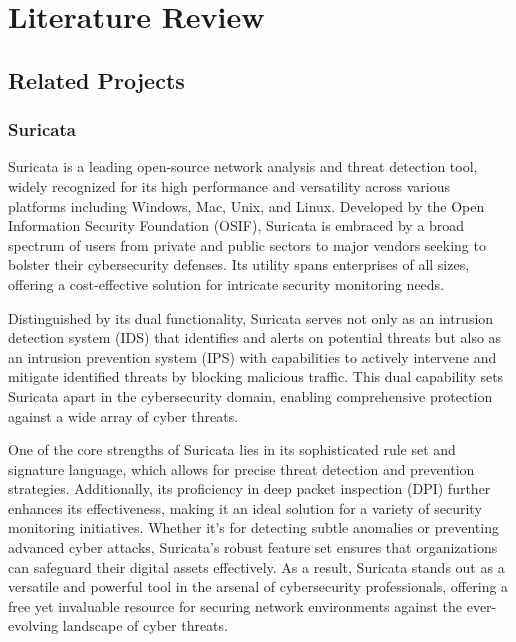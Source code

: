 \chapter{Literature Review}
\vspace{-18pt}
\section{Related Projects}
\vspace{-18pt}
\subsection{Suricata}
\vspace{-18pt}
Suricata is a leading open-source network analysis and threat detection tool, widely recognized for its high performance and versatility across various platforms including Windows, Mac, Unix, and Linux. Developed by the Open Information Security Foundation (OSIF), Suricata is embraced by a broad spectrum of users from private and public sectors to major vendors seeking to bolster their cybersecurity defenses. Its utility spans enterprises of all sizes, offering a cost-effective solution for intricate security monitoring needs.\par 
Distinguished by its dual functionality, Suricata serves not only as an intrusion detection system (IDS) that identifies and alerts on potential threats but also as an intrusion prevention system (IPS) with capabilities to actively intervene and mitigate identified threats by blocking malicious traffic. This dual capability sets Suricata apart in the cybersecurity domain, enabling comprehensive protection against a wide array of cyber threats.\par 
One of the core strengths of Suricata lies in its sophisticated rule set and signature language, which allows for precise threat detection and prevention strategies. Additionally, its proficiency in deep packet inspection (DPI) further enhances its effectiveness, making it an ideal solution for a variety of security monitoring initiatives. Whether it's for detecting subtle anomalies or preventing advanced cyber attacks, Suricata's robust feature set ensures that organizations can safeguard their digital assets effectively. As a result, Suricata stands out as a versatile and powerful tool in the arsenal of cybersecurity professionals, offering a free yet invaluable resource for securing network environments against the ever-evolving landscape of cyber threats.
